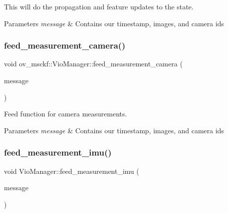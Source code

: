 This will do the propagation and feature updates to the state. 


\begin{DoxyParams}{Parameters}
{\em message} & Contains our timestamp, images, and camera ids \\
\hline
\end{DoxyParams}
\mbox{\label{classov__msckf_1_1VioManager_a96cd1d24579772a7e1f6c6ff068dc489}} 
\subsubsection{\texorpdfstring{feed\+\_\+measurement\+\_\+camera()}{feed\_measurement\_camera()}}
{\footnotesize\ttfamily void ov\+\_\+msckf\+::\+Vio\+Manager\+::feed\+\_\+measurement\+\_\+camera (\begin{DoxyParamCaption}\item[{const \hyperlink{structov__core_1_1CameraData}{ov\+\_\+core\+::\+Camera\+Data} \&}]{message }\end{DoxyParamCaption})\hspace{0.3cm}{\ttfamily [inline]}}



Feed function for camera measurements. 


\begin{DoxyParams}{Parameters}
{\em message} & Contains our timestamp, images, and camera ids \\
\hline
\end{DoxyParams}
\mbox{\label{classov__msckf_1_1VioManager_a5e7dde1c28eb800c663fb2e238cc60ea}} 
\subsubsection{\texorpdfstring{feed\+\_\+measurement\+\_\+imu()}{feed\_measurement\_imu()}}
{\footnotesize\ttfamily void Vio\+Manager\+::feed\+\_\+measurement\+\_\+imu (\begin{DoxyParamCaption}\item[{const \hyperlink{structov__core_1_1ImuData}{ov\+\_\+core\+::\+Imu\+Data} \&}]{message }\end{DoxyParamCaption})}



